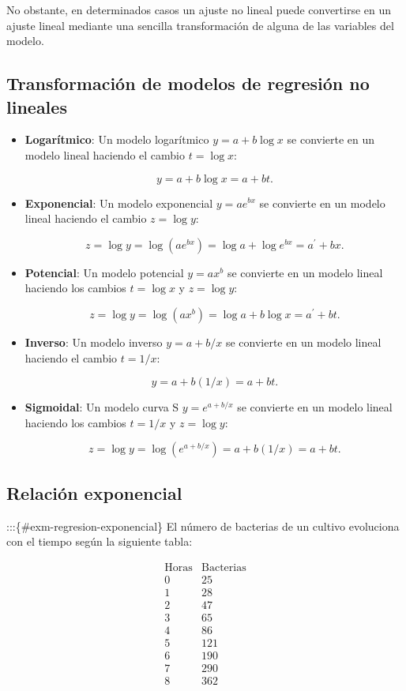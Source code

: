 \documentclass[
  a4paper,
]{scrreport}
\theoremstyle{plain}
\theoremstyle{definition}
\theoremstyle{definition}
\theoremstyle{remark}
\begin{document}
No obstante, en determinados casos un ajuste no lineal puede convertirse
en un ajuste lineal mediante una sencilla transformación de alguna de
las variables del modelo.

\subsection{Transformación de modelos de regresión no
lineales}\label{transformaciuxf3n-de-modelos-de-regresiuxf3n-no-lineales}

\begin{itemize}
\item
  \textbf{Logarítmico}: Un modelo logarítmico \(y = a+b \log x\) se
  convierte en un modelo lineal haciendo el cambio \(t=\log x\):

  \[y=a+b\log x = a+bt.\]
\item
  \textbf{Exponencial}: Un modelo exponencial \(y = ae^{bx}\) se
  convierte en un modelo lineal haciendo el cambio \(z = \log y\):

  \[z = \log y = \log(ae^{bx}) =  \log a + \log e^{bx} = a^\prime +bx.\]
\item
  \textbf{Potencial}: Un modelo potencial \(y = ax^b\) se convierte en
  un modelo lineal haciendo los cambios \(t=\log x\) y \(z=\log y\):

  \[z = \log y = \log(ax^b) = \log a + b \log x = a^\prime+bt.\]
\item
  \textbf{Inverso}: Un modelo inverso \(y = a+b/x\) se convierte en un
  modelo lineal haciendo el cambio \(t=1/x\):

  \[y = a + b(1/x) = a+bt.\]
\item
  \textbf{Sigmoidal}: Un modelo curva S \(y = e^{a+b/x}\) se convierte
  en un modelo lineal haciendo los cambios \(t=1/x\) y \(z=\log y\):

  \[z = \log y = \log (e^{a+b/x}) = a+b(1/x) = a+bt.\]
\end{itemize}

\subsection{Relación exponencial}\label{relaciuxf3n-exponencial}

:::\{\#exm-regresion-exponencial\} El número de bacterias de un cultivo
evoluciona con el tiempo según la siguiente tabla:

\[\begin{array}{c|c}
\mbox{Horas} & \mbox{Bacterias}\\
\hline
0 &  25 \\
1 & 28 \\
2 &  47\\
3 & 65 \\
4 & 86\\
5 & 121\\
6 & 190\\
7 & 290\\
8 & 362
\end{array}
\]
\end{document}
